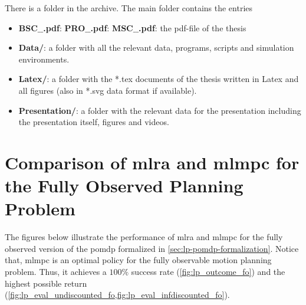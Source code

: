 \begin{appendix}
{	%
	There is a folder
 in the archive. The main folder contains the entries
	\begin{itemize}
		\item {}
		{\textbf{BSC$\_$\NummerDerArbeit$\_$\NachnameDesStudenten.pdf}:}{}
		{\textbf{PRO$\_$\NummerDerArbeit$\_$\NachnameDesStudenten.pdf}:}{}
		{\textbf{MSC$\_$\NummerDerArbeit$\_$\NachnameDesStudenten.pdf}:}{}
		the pdf-file of the thesis
		\item \textbf{Data/}: a folder with all the relevant data, programs, scripts and simulation environments.
		\item \textbf{Latex/}: a folder with the *.tex documents of the thesis
		written in Latex and all figures (also in *.svg data format if available).
		\item \textbf{Presentation/}: a folder with the relevant data for the presentation including the presentation itself, figures and videos.
	\end{itemize}
}{}

\clearpage
\section{Comparison of \ac{mlra} and \ac{mlmpc} for the Fully Observed Planning Problem}\label{apx:fo-comparison}

The figures below illustrate the performance of \ac{mlra} and \ac{mlmpc} for
the fully observed version of the \ac{pomdp} formalized in
\cref{sec:lp-pomdp-formalization}. Notice that, \ac{mlmpc} is an optimal policy
for the fully observable motion planning problem. Thus, it achieves a $100\%$
success rate (\cf \cref{fig:lp_outcome_fo}) and the highest possible return
(\cf \cref{fig:lp_eval_undiscounted_fo,fig:lp_eval_infdiscounted_fo}).


\end{appendix}
